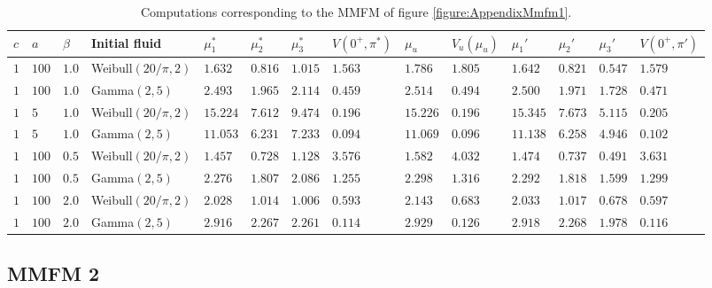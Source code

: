 \begin{landscape}
	\begin{table}[H]
		\centering
		\begin{tabularx}{\linewidth}{llllllllllllll}
			$c$& $a$ & $\beta$ & Initial fluid & $\mu_1^*$ & $\mu_2^*$ & $\mu_3^*$ & $V(0^+,\pi^*)$ & $\mu_u$ & $V_u(\mu_u)$ &$\mu_1'$ & $\mu_2'$ & $\mu_3'$ &$V(0^+,\pi')$  \\
			\hline    
			$1$ & $100$ & $1.0$ & Weibull$(20/\pi,2)$ & $1.632$ & $0.816$ & $1.015$ & $1.563$ & $1.786$ & $1.805$ & $1.642$ & $0.821$ & $0.547$ & $1.579$ \\ 
			$1$ & $100$ & $1.0$ & Gamma$(2,5)$ & $2.493$ & $1.965$ & $2.114$ & $0.459$ & $2.514$ & $0.494$ & $2.500$ & $1.971$ & $1.728$ & $0.471$ \\ 
			$1$ & $5$ & $1.0$ & Weibull$(20/\pi,2)$ & $15.224$ & $7.612$ & $9.474$ & $0.196$ & $15.226$ & $0.196$ & $15.345$ & $7.673$ & $5.115$ & $0.205$ \\ 
			$1$ & $5$ & $1.0$ & Gamma$(2,5)$ & $11.053$ & $6.231$ & $7.233$ & $0.094$ & $11.069$ & $0.096$ & $11.138$ & $6.258$ & $4.946$ & $0.102$ \\ 
			$1$ & $100$ & $0.5$ & Weibull$(20/\pi,2)$ & $1.457$ & $0.728$ & $1.128$ & $3.576$ & $1.582$ & $4.032$ & $1.474$ & $0.737$ & $0.491$ & $3.631$ \\ 
			$1$ & $100$ & $0.5$ & Gamma$(2,5)$ & $2.276$ & $1.807$ & $2.086$ & $1.255$ & $2.298$ & $1.316$ & $2.292$ & $1.818$ & $1.599$ & $1.299$ \\ 
			$1$ & $100$ & $2.0$ & Weibull$(20/\pi,2)$ & $2.028$ & $1.014$ & $1.006$ & $0.593$ & $2.143$ & $0.683$ & $2.033$ & $1.017$ & $0.678$ & $0.597$ \\ 
			$1$ & $100$ & $2.0$ & Gamma$(2,5)$ & $2.916$ & $2.267$ & $2.261$ & $0.114$ & $2.929$ & $0.126$ & $2.918$ & $2.268$ & $1.978$ & $0.116$ \\ 
		\end{tabularx}
		\caption{Computations corresponding to the MMFM of figure \ref{figure:AppendixMmfm1}.}
		\label{table:MmfmComputations1}
	\end{table}
	\subsection{MMFM 2}
	
	\begin{figure}[H]
		\centering
		\begin{tikzpicture}[->,>=stealth',shorten >=1pt,auto,node distance=3cm,
		thick,main node/.style={circle,draw,font=\sffamily\Large\bfseries, scale=1}, edge node/.style={scale=1},scale=1]
		

\end{tikzpicture}
\end{figure}
\end{landscape}
